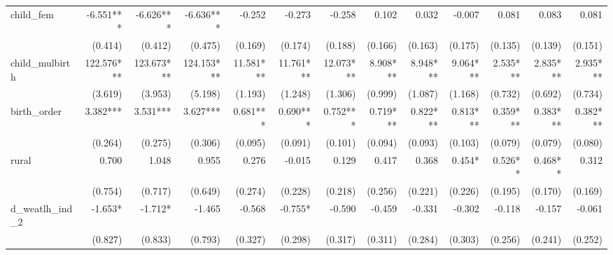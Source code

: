 \begin{tabular}{lrrrrrrrrrrrr}
child\_fem                                  &    -6.551*** &    -6.626*** &    -6.636*** &       -0.252 &       -0.273 &       -0.258 &        0.102 &        0.032 &       -0.007 &        0.081 &        0.083 &        0.081 \\ 
                                            &      (0.414) &      (0.412) &      (0.475) &      (0.169) &      (0.174) &      (0.188) &      (0.166) &      (0.163) &      (0.175) &      (0.135) &      (0.139) &      (0.151) \\ 
child\_mulbirth                             &   122.576*** &   123.673*** &   124.153*** &    11.581*** &    11.761*** &    12.073*** &     8.908*** &     8.948*** &     9.064*** &     2.535*** &     2.835*** &     2.935*** \\ 
                                            &      (3.619) &      (3.953) &      (5.198) &      (1.193) &      (1.248) &      (1.306) &      (0.999) &      (1.087) &      (1.168) &      (0.732) &      (0.692) &      (0.734) \\ 
birth\_order                                &     3.382*** &     3.531*** &     3.627*** &     0.681*** &     0.690*** &     0.752*** &     0.719*** &     0.822*** &     0.813*** &     0.359*** &     0.383*** &     0.382*** \\ 
                                            &      (0.264) &      (0.275) &      (0.306) &      (0.095) &      (0.091) &      (0.101) &      (0.094) &      (0.093) &      (0.103) &      (0.079) &      (0.079) &      (0.080) \\ 
rural                                       &        0.700 &        1.048 &        0.955 &        0.276 &       -0.015 &        0.129 &        0.417 &        0.368 &       0.454* &      0.526** &      0.468** &        0.312 \\ 
                                            &      (0.754) &      (0.717) &      (0.649) &      (0.274) &      (0.228) &      (0.218) &      (0.256) &      (0.221) &      (0.226) &      (0.195) &      (0.170) &      (0.169) \\ 
d\_weatlh\_ind\_2                           &      -1.653* &      -1.712* &       -1.465 &       -0.568 &      -0.755* &       -0.590 &       -0.459 &       -0.331 &       -0.302 &       -0.118 &       -0.157 &       -0.061 \\ 
                                            &      (0.827) &      (0.833) &      (0.793) &      (0.327) &      (0.298) &      (0.317) &      (0.311) &      (0.284) &      (0.303) &      (0.256) &      (0.241) &      (0.252) \\ 

\end{tabular}
